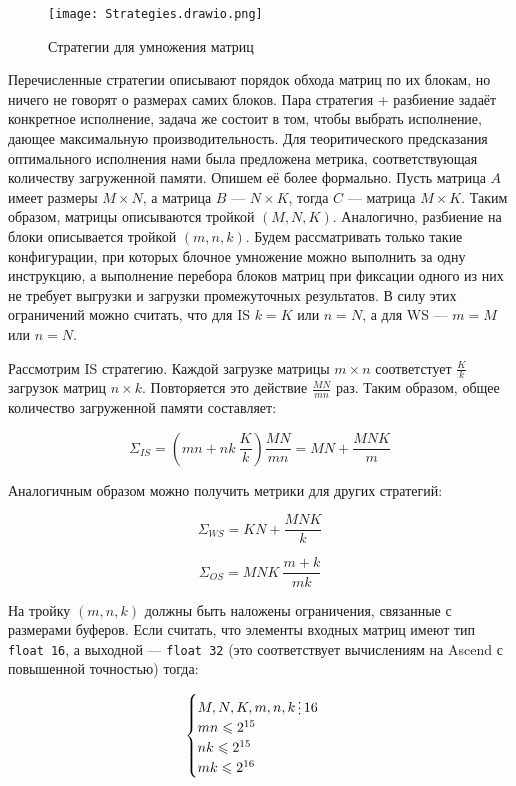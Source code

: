 \begin{figure}[h!]
    \centering
    \texttt{[image: Strategies.drawio.png]}
    \caption{Стратегии для умножения матриц}
\end{figure}

Перечисленные стратегии описывают порядок обхода матриц по их блокам, но ничего
не говорят о размерах самих блоков. Пара стратегия + разбиение задаёт конкретное
исполнение, задача же состоит в том, чтобы выбрать исполнение, дающее
максимальную производительность. Для теоритического предсказания оптимального
исполнения нами была предложена метрика, соответствующая количеству загруженной
памяти. Опишем её более формально. Пусть матрица $A$ имеет размеры $M \times N$, а
матрица $B$ --- $N \times K$, тогда $C$ --- матрица $M \times K$. Таким образом,
матрицы описываются тройкой $(M, N, K)$. Аналогично, разбиение на блоки
описывается тройкой $(m, n, k)$. Будем рассматривать только такие конфигурации,
при которых блочное умножение можно выполнить за одну инструкцию, а выполнение
перебора блоков матриц при фиксации одного из них не требует выгрузки и загрузки
промежуточных результатов. В силу этих ограничений можно считать, что для IS
$k = K$ или $n = N$, а для WS --- $m = M$ или $n = N$.

Рассмотрим IS стратегию. Каждой загрузке матрицы $m \times n$ соответстует
$\frac{K}{k}$ загрузок матриц $n \times k$. Повторяется это действие
$\frac{MN}{mn}$ раз. Таким образом, общее количество загруженной памяти
составляет:

\[
    \Sigma_{IS} = \left( mn + nk ~ \frac{K}{k} \right) \frac{MN}{mn} = MN + \frac{MNK}{m}
\]

Аналогичным образом можно получить метрики для других стратегий:

\[
    \Sigma_{WS} = KN + \frac{MNK}{k}
\]

\[
    \Sigma_{OS} = MNK ~ \frac{m + k}{mk}
\]

На тройку $(m, n, k)$ должны быть наложены ограничения, связанные с размерами буферов.
Если считать, что элементы входных матриц имеют тип \texttt{float 16}, а выходной ---
\texttt{float 32} (это соответствует вычислениям на Ascend с повышенной точностью) тогда:

\[
\begin{cases}
    M, N, K, m, n, k \divisible 16 \\
    mn \leqslant 2^{15} \\
    nk \leqslant 2^{15} \\
    mk \leqslant 2^{16}
\end{cases}
\]

